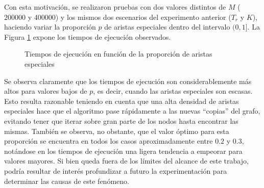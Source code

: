     Con esta motivación, se realizaron pruebas con dos valores distintos de
    $M$ ($200000$ y $400000$) y los mismos dos escenarios del experimento
    anterior ($T_r$ y $K$), haciendo variar la proporción $p$ de aristas
    especiales dentro del intervalo $(0, 1]$. La Figura
    \ref{fig:exp1:aristas-esp} expone los tiempos de ejecución observados.

    \begin{figure}[H]
        \centering
        \caption{Tiempos de ejecución en función de la proporción de aristas
        especiales}
        \label{fig:exp1:aristas-esp}
    \end{figure}

    Se observa claramente que los tiempos de ejecución son considerablemente
    más altos para valores bajos de $p$, es decir, cuando las aristas
    especiales son escasas. Esto resulta razonable teniendo en cuenta que
    una alta densidad de aristas especiales hace que el algoritmo pase
    rápidamente a las nuevas ``copias'' del grafo, evitando tener que iterar
    sobre gran parte de los nodos hasta encontrar las mismas. También se
    observa, no obstante, que el valor óptimo para esta proporción se
    encuentra en todos los casos aproximadamente entre $0.2$ y $0.3$,
    notándose en los tiempos de ejecución una ligera tendencia a empeorar para
    valores mayores. Si bien queda fuera de los límites del alcance de
    este trabajo, podría resultar de interés profundizar a futuro la
    experimentación para determinar las causas de este fenómeno.
